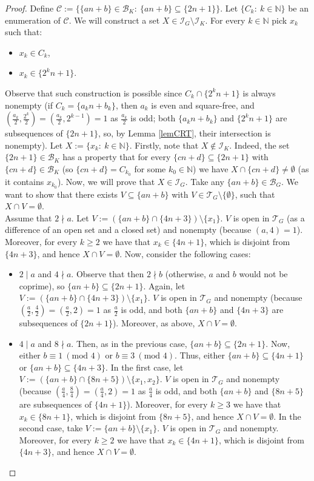 \documentclass{amsart}
\theoremstyle{definition}
\newcommand{\N}{{\mathbb N}}
\newcommand{\I}{\mathcal I}
\newcommand{\T}{\mathcal{T}}
\newcommand{\B}{\mathcal{B}}
\newcommand{\modulo}{\textrm{mod }}
\begin{document}
\begin{proof}
Define $\mathcal{C} := \{\{an+b\}\in \B_K :\ \{an+b\}\subseteq \{2n+1\}\}$. Let $\{C_k :\ k\in\N\}$ be an enumeration of $\mathcal{C}$.
We will construct a set $X \in \I_G \setminus \I_K$. For every $k\in\N$ pick $x_k$ such that:
\begin{itemize}
	\item $x_k\in C_k$,
	\item $x_k\in \{2^k n+1\}$.
\end{itemize}
Observe that such construction is possible since $C_k \cap \{2^k n+1\}$ is always nonempty (if $C_k = \{a_k n+b_k\}$, then $a_k$ is even and square-free, and $\left(\frac{a_k}{2},\frac{2^k}{2}\right)=\left(\frac{a_k}{2},2^{k-1}\right)=1$ as $\frac{a_k}{2}$ is odd; both $\{a_k n+b_k\}$ and $\{2^k n+1\}$ are subsequences of $\{2n+1\}$, so, by Lemma \ref{lemCRT}, their intersection is nonempty). Let $X := \{x_k :\ k\in\N\}$.
Firstly, note that $X \notin \I_K$. Indeed, the set $\{2n+1\}\in\B_K$ has a property that for every $\{cn+d\}\subseteq \{2n+1\}$ with $\{cn+d\}\in \B_K$ (so $\{cn+d\}=C_{k_0}$ for some $k_0\in\N$) we have $X\cap \{cn+d\} \neq \emptyset$ (as it contains $x_{k_0}$).
Now, we will prove that $X \in \I_G$. Take any $\{an+b\}\in\B_G$. We want to show that there exists $V\subseteq \{an+b\}$ with $V\in \T_G\setminus\{\emptyset\}$, such that $X\cap V = \emptyset$. \\
Assume that $2\nmid a$. Let $V := (\{an+b\} \cap \{4n+3\})\setminus\{x_1\}$. $V$ is open in $\T_G$ (as a difference of an open set and a closed set) and nonempty (because $(a,4)=1$). Moreover, for every $k\geq 2$ we have that $x_k\in \{4n+1\}$, which is disjoint from $\{4n+3\}$, and hence $X\cap V = \emptyset$.
Now, consider the following cases:
\begin{itemize}
 \item $2\mid a$ and $4\nmid a$. Observe that then $2 \nmid b$ (otherwise, $a$ and $b$ would not be coprime), so $\{an+b\}\subseteq \{2n+1\}$. Again, let $V := (\{an+b\} \cap \{4n+3\})\setminus\{x_1\}$. $V$ is open in $\T_G$ and nonempty (because $\left(\frac{a}{2},\frac{4}{2}\right)=\left(\frac{a}{2},2\right)=1$ as $\frac{a}{2}$ is odd, and both $\{an+b\}$ and $\{4n+3\}$ are subsequences of $\{2n+1\}$). Moreover, as above, $X\cap V = \emptyset$.
 \item $4\mid a$ and $8\nmid a$. Then, as in the previous case, $\{an+b\}\subseteq \{2n+1\}$. Now, either $b\equiv 1\ (\modulo 4)$ or $b\equiv 3\ (\modulo 4)$. Thus, either $\{an+b\}\subseteq \{4n+1\}$ or $\{an+b\}\subseteq \{4n+3\}$. In the first case, let $V := (\{an+b\} \cap \{8n+5\})\setminus\{x_1, x_2\}$. $V$ is open in $\T_G$ and nonempty (because $\left(\frac{a}{4},\frac{8}{4}\right)=\left(\frac{a}{4},2\right)=1$ as $\frac{a}{4}$ is odd, and both $\{an+b\}$ and $\{8n+5\}$ are subsequences of $\{4n+1\}$). Moreover, for every $k\geq 3$ we have that $x_k\in \{8n+1\}$, which is disjoint from $\{8n+5\}$, and hence $X\cap V = \emptyset$. In the second case, take $V := \{an+b\} \setminus\{x_1\}$. $V$ is open in $\T_G$ and nonempty. Moreover, for every $k\geq 2$ we have that $x_k\in \{4n+1\}$, which is disjoint from $\{4n+3\}$, and hence $X\cap V = \emptyset$.

\end{itemize}
\end{proof}
\end{document}
